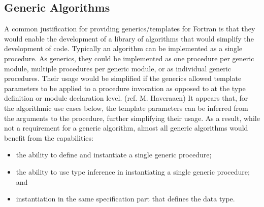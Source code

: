 \documentclass{article}
\newcounter{requirement}
\begin{document}
\subsection{Generic Algorithms}

A common justification for providing generics/templates for Fortran is
that they would enable the development of a library of algorithms that
would simplify the development of code.
Typically an algorithm can be implemented as a single procedure.
As generics, they could be implemented as one
procedure per generic module, multiple procedures per generic
module, or as individual generic procedures.
Their usage would be simplified if the generics allowed template
parameters to be applied to a procedure invocation as opposed to at
the type definition or module declaration level.  (ref. M. Haveraaen)
It appears that, for the algorithmic use cases below, the template
parameters can be inferred from the arguments to the procedure,
further simplifying their usage. As a result, while  not a requirement
for a generic algorithm, almost all generic algorithms would benefit
from   the  capabilities:
\begin{itemize}
\item the ability to define and instantiate a single generic procedure;

\item the ability to use type inference in instantiating a single
  generic procedure; and

\item instantiation in the same specification part that defines the
  data type.
\end{itemize}
\end{document}
